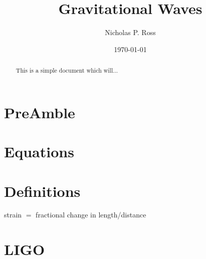 \documentclass[11pt]{article}
\begin{document}
\title{Gravitational Waves}
\author{Nicholas P. Ross}
\date{\today}
\maketitle


\begin{abstract}
This is a simple document which will... 
\end{abstract}


\section{PreAmble}


\section{Equations}


\section{Definitions}
strain $=$ fractional change in length/distance\\


\section{LIGO}
\end{document}
